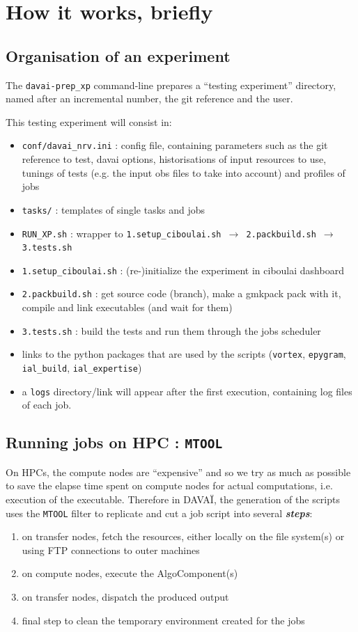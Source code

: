 \documentclass[a4paper,10pt,twoside]{article}
\begin{document}
\newpage
\section{How it works, briefly}
\subsection{Organisation of an experiment}
The \texttt{davai-prep\_xp} command-line prepares a ``testing experiment'' directory, named after an incremental number, the git reference and the user.

\noindent This testing experiment will consist in:
\begin{itemize}
 \item \texttt{conf/davai\_nrv.ini} : config file, containing parameters such as the git reference to test, davai options, historisations of input resources to use, tunings of tests (e.g. the input obs files to take into account) and profiles of jobs
 \item \texttt{tasks/} : templates of single tasks and jobs
 \item \texttt{RUN\_XP.sh} : wrapper to \texttt{1.setup\_ciboulai.sh $\rightarrow$ 2.packbuild.sh $\rightarrow$ 3.tests.sh}
 \item \texttt{1.setup\_ciboulai.sh} : (re-)initialize the experiment in ciboulai dashboard
 \item \texttt{2.packbuild.sh} : get source code (branch), make a gmkpack pack with it, compile and link executables (and wait for them)
 \item \texttt{3.tests.sh} : build the tests and run them through the jobs scheduler
 \item links to the python packages that are used by the scripts (\texttt{vortex}, \texttt{epygram}, \texttt{ial\_build}, \texttt{ial\_expertise})
 \item a \texttt{logs} directory/link will appear after the first execution, containing log files of each job.
\end{itemize}


\subsection{Running jobs on HPC : \texttt{MTOOL}}
On HPCs, the compute nodes are ``expensive'' and so we try as much as possible to save the elapse time spent on compute nodes for actual computations, i.e. execution of the executable.
Therefore in DAVAÏ, the generation of the scripts uses the \texttt{MTOOL} filter to replicate and cut a job script into several \textit{\textbf{steps}}:
\begin{enumerate}[label=(step.0\arabic*)]
 \item on transfer nodes, fetch the resources, either locally on the file system(s) or using FTP connections to outer machines
 \item on compute nodes, execute the AlgoComponent(s)
 \item on transfer nodes, dispatch the produced output
 \item final step to clean the temporary environment created for the jobs
\end{enumerate}
\end{document}
